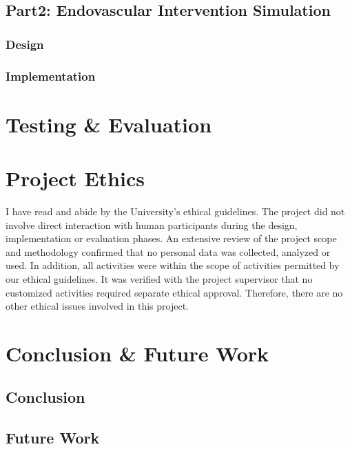 \documentclass[12pt]{article}
\begin{document}
\subsection{Part2: Endovascular Intervention Simulation}

\subsubsection{Design}

\subsubsection{Implementation}


\section{Testing \& Evaluation}

\section{Project Ethics}
I have read and abide by the University’s ethical guidelines\cite{UoL_COMP390_2023-24}. The project did not involve direct interaction with human
participants during the design, implementation or evaluation phases. An extensive review of the project scope and methodology
confirmed that no personal data was collected, analyzed or used. In addition, all activities were within the scope of activities
permitted by our ethical guidelines. It was verified with the project supervisor that no customized activities required separate
ethical approval. Therefore, there are no other ethical issues involved in this project.
\section{Conclusion \& Future Work}
\subsection{Conclusion}

\subsection{Future Work}
\end{document}
